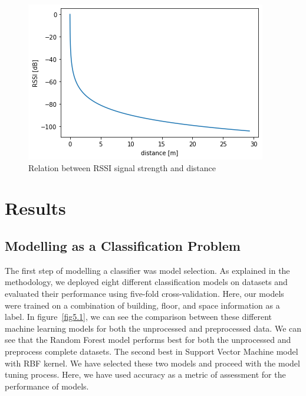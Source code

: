 \documentclass[a4paper,singleside,12pt]{report} %
\begin{document}
				
				\begin{figure}[h!]
					\centering
					\includegraphics[width=0.7\linewidth]{./figures/Received signal strength vs distance.png}
					\caption{Relation between RSSI signal strength and distance}
					 \label{fig4.15}
				\end{figure}


	\chapter{Results}
		\section{Modelling as a Classification Problem}

			The first step of modelling a classifier was model selection. 
			As explained in the methodology, we deployed eight different classification models on datasets and evaluated their performance using five-fold cross-validation. 
			Here, our models were trained on a combination of building, floor, and space information as a label. 
			In figure~\ref{fig5.1}, we can see the comparison between these different machine learning models for both the unprocessed and preprocessed data. 
			We can see that the Random Forest model performs best for both the unprocessed and preprocess complete datasets. 
			The second best in Support Vector Machine model with RBF kernel. We have selected these two models and proceed with the model tuning process. 
			Here, we have used accuracy as a metric of assessment for the performance of models.
			
\end{document}
